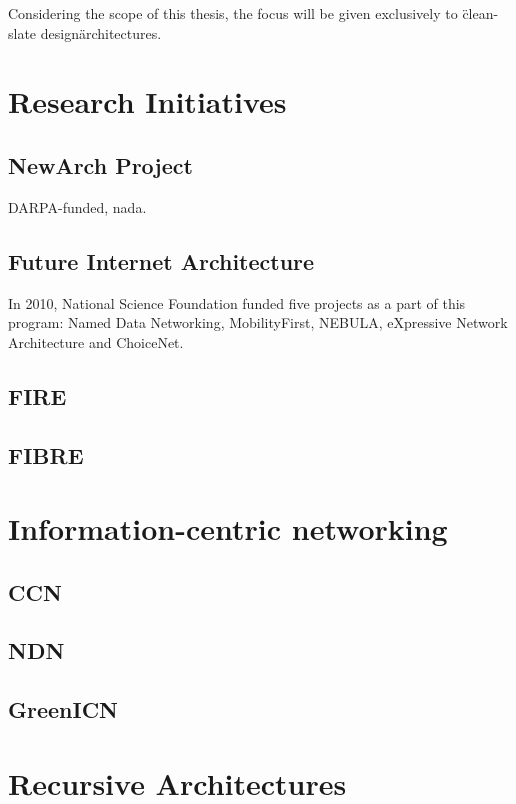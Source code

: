         Considering the scope of this thesis, the focus will be given exclusively to \"clean-slate design\" architectures.

    \section{Research Initiatives}

        \subsection{NewArch Project}

            DARPA-funded, nada.

        \subsection{Future Internet Architecture}

            In 2010, National Science Foundation funded five projects as a part of this program: Named Data Networking, MobilityFirst, NEBULA, eXpressive Network Architecture and ChoiceNet.

        \subsection{FIRE}
        \subsection{FIBRE}

    \section{Information-centric networking}

        \subsection{CCN}
        \subsection{NDN}
        \subsection{GreenICN}

    \section{Recursive Architectures}
